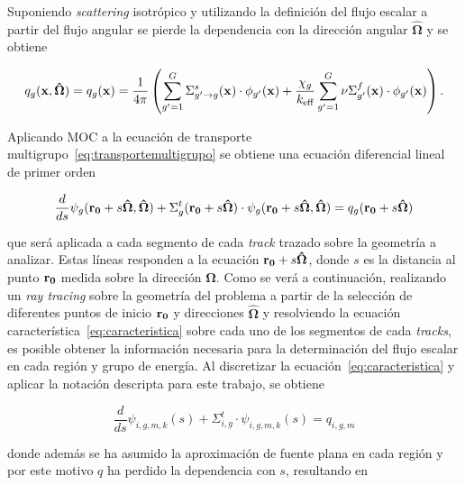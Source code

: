 \documentclass[11pt]{article}
\numberwithin{equation}{section}
\renewcommand{\vec}[1]{\ensuremath\mathbf{#1}}
\begin{document}
\noindent
Suponiendo \emph{scattering} isotrópico y utilizando la definición del flujo escalar a partir del flujo angular se pierde la dependencia con la dirección angular $\boldsymbol{\hat{\Omega}}$ y se obtiene

\begin{equation} \label{eq:fuentemultigrupo-2}
 q_g(\vec{x}, \boldsymbol{\hat{\Omega}}) = 
 q_g(\vec{x}) = 
 \frac{1}{4\pi} \left(
 \sum_{g^\prime=1}^G \Sigma^s_{g^\prime \rightarrow g}(\vec{x}) \cdot \phi_{g^\prime}(\vec{x})
 + \frac{\chi_g}{k_{\text{eff}}} \sum_{g^\prime=1}^G \nu\Sigma^f_{g^\prime}(\vec{x}) \cdot \phi_{g^\prime}(\vec{x}) 
 \right).
\end{equation}

Aplicando MOC a la ecuación de transporte multigrupo~\eqref{eq:transportemultigrupo} se obtiene una ecuación diferencial lineal de primer orden~\cite{glasstone,handbook-ingnuclear}

\begin{equation} \label{eq:caracteristica}
 \frac{d}{ds}\psi_g(\vec{r_0}+s\boldsymbol{\hat{\Omega}},\boldsymbol{\hat{\Omega}}) 
 + \Sigma^t_g(\vec{r_0}+s\boldsymbol{\hat{\Omega}}) \cdot \psi_g(\vec{r_0}+s\boldsymbol{\hat{\Omega}}, \boldsymbol{\hat{\Omega}}) = 
 q_g(\vec{r_0}+s\boldsymbol{\hat{\Omega}})
\end{equation}

\noindent
que será aplicada a cada segmento de cada \emph{track} trazado sobre la geometría a analizar. Estas líneas responden a la ecuación $\vec{r_0}+s\boldsymbol{\hat{\Omega}}$, donde $s$ es la distancia al punto $\vec{r_0}$ medida sobre la dirección $\boldsymbol{\hat{\Omega}}$. Como se verá a continuación, realizando un \emph{ray tracing} sobre la geometría del problema a partir de la selección de diferentes puntos de inicio $\vec{r_0}$ y direcciones $\boldsymbol{\hat{\Omega}}$ y resolviendo la ecuación característica~\eqref{eq:caracteristica} sobre cada uno de los segmentos de cada \emph{tracks}, es posible obtener la información necesaria para la determinación del flujo escalar en cada región y grupo de energía. Al discretizar la ecuación~\eqref{eq:caracteristica} y aplicar la notación descripta para este trabajo, se obtiene

\begin{equation} \label{eq:edo-disc}
 \frac{d}{ds}\psi_{i,g,m,k} (s)
 + \Sigma^t_{i,g} \cdot \psi_{i,g,m,k} (s) = 
 q_{i,g,m}
\end{equation}

\noindent
donde además se ha asumido la aproximación de fuente plana en cada región y por este motivo $q$ ha perdido la dependencia con $s$, resultando en
\end{document}
